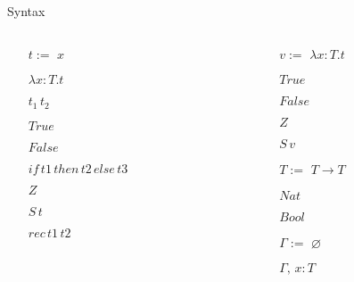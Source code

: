 \documentclass[presentation]{beamer}
\begin{document}
\begin{frame}[label={sec:orgf79d65e}]{Syntax}
\begin{columns}
\begin{column}[t]{0.5\columnwidth}
\begin{itemize}
\item[$t :=$] $x$
\item[] $\lambda x:T.t$
\item[] $t_1\,t_2$
\item[] $True$
\item[] $False$
\item[] $if \, t1 \, then \, t2 \, else \, t3$
\item[] $Z$
\item[] $S\,t$
\item[] $rec \, t1 \, t2$
\end{itemize}
\end{column}

\begin{column}[t]{0.5\columnwidth}
\begin{itemize}
\item[$v :=$] $\lambda x:T.t$
\item[] $True$
\item[] $False$
\item[] $Z$
\item[] $S\,v$
\end{itemize}

\begin{itemize}
\item[$T :=$] $T \to T$
\item[] $Nat$
\item[] $Bool$
\end{itemize}

\begin{itemize}
\item[$\Gamma :=$] $\varnothing$
\item[] $\Gamma,\,x:T$
\end{itemize}
\end{column}
\end{columns}
\end{frame}
\end{document}

